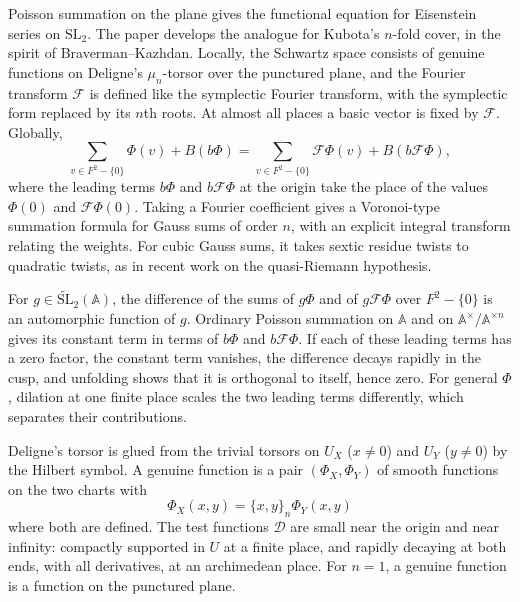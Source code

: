
\begin{sketch}[document]
  Poisson summation on the plane gives the functional equation for Eisenstein series on $\mathrm{SL}_2$.  The paper develops the analogue for Kubota's $n$-fold cover, in the spirit of Braverman--Kazhdan.  Locally, the Schwartz space consists of genuine functions on Deligne's $\mu_n$-torsor over the punctured plane, and the Fourier transform $\mathcal{F}$ is defined like the symplectic Fourier transform, with the symplectic form replaced by its $n$th roots.  At almost all places a basic vector is fixed by $\mathcal{F}$.  Globally,
  \[
    \sum_{v \in F^2 - \{0\}} \Phi(v) + B(b \Phi)
    =
    \sum_{v \in F^2 - \{0\}} \mathcal{F} \Phi(v) + B(b \mathcal{F} \Phi),
  \]
  where the leading terms $b \Phi$ and $b \mathcal{F} \Phi$ at the origin take the place of the values $\Phi(0)$ and $\mathcal{F} \Phi(0)$.  Taking a Fourier coefficient gives a Voronoi-type summation formula for Gauss sums of order $n$, with an explicit integral transform relating the weights.  For cubic Gauss sums, it takes sextic residue twists to quadratic twists, as in recent work on the quasi-Riemann hypothesis.
\end{sketch}


\begin{sketch}
  For $g \in \widetilde{\mathrm{SL}}_2(\mathbb{A})$, the difference of the sums of $g \Phi$ and of $g \mathcal{F} \Phi$ over $F^2 - \{0\}$ is an automorphic function of $g$.  Ordinary Poisson summation on $\mathbb{A}$ and on $\mathbb{A}^\times / \mathbb{A}^{\times n}$ gives its constant term in terms of $b \Phi$ and $b \mathcal{F} \Phi$.  If each of these leading terms has a zero factor, the constant term vanishes, the difference decays rapidly in the cusp, and unfolding shows that it is orthogonal to itself, hence zero.  For general $\Phi$, dilation at one finite place scales the two leading terms differently, which separates their contributions.
\end{sketch}


\begin{sketch}
  Deligne's torsor is glued from the trivial torsors on $U_X$ ($x \neq 0$) and $U_Y$ ($y \neq 0$) by the Hilbert symbol.  A genuine function is a pair $(\Phi_X, \Phi_Y)$ of smooth functions on the two charts with
  \[
    \Phi_X(x, y) = \{x, y\}_n \Phi_Y(x, y)
  \]
  where both are defined.  The test functions $\mathcal{D}$ are small near the origin and near infinity: compactly supported in $U$ at a finite place, and rapidly decaying at both ends, with all derivatives, at an archimedean place.  For $n = 1$, a genuine function is a function on the punctured plane.
\end{sketch}

